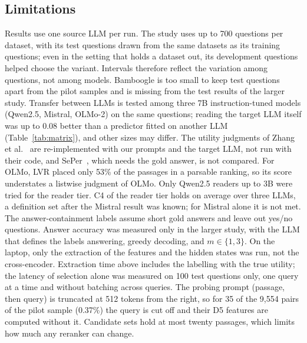 \documentclass[conference]{IEEEtran}
\begin{document}
\subsection{Limitations}
Results use one source LLM per run. The study uses up to 700 questions per dataset, with its test questions drawn from the same datasets as its training questions; even in the setting that holds a dataset out, its development questions helped choose the variant. Intervals therefore reflect the variation among questions, not among models. Bamboogle is too small to keep test questions apart from the pilot samples and is missing from the test results of the larger study. Transfer between LLMs is tested among three 7B instruction-tuned models (Qwen2.5, Mistral, OLMo-2) on the same questions; reading the target LLM itself was up to 0.08 better than a predictor fitted on another LLM (Table~\ref{tab:matrix}), and other sizes may differ. The utility judgments of Zhang et al.~\cite{zhang2025c} are re-implemented with our prompts and the target LLM, not run with their code, and SePer~\cite{dai2025}, which needs the gold answer, is not compared. For OLMo, LVR placed only 53\% of the passages in a parsable ranking, so its score understates a listwise judgment of OLMo. Only Qwen2.5 readers up to 3B were tried for the reader tier. C4 of the reader tier holds on average over three LLMs, a definition set after the Mistral result was known; for Mistral alone it is not met. The answer-containment labels assume short gold answers and leave out yes/no questions. Answer accuracy was measured only in the larger study, with the LLM that defines the labels answering, greedy decoding, and $m \in \{1, 3\}$. On the laptop, only the extraction of the features and the hidden states was run, not the cross-encoder. Extraction time above includes the labelling with the true utility; the latency of selection alone was measured on 100 test questions only, one query at a time and without batching across queries. The probing prompt (passage, then query) is truncated at 512 tokens from the right, so for 35 of the 9,554 pairs of the pilot sample (0.37\%) the query is cut off and their D5 features are computed without it. Candidate sets hold at most twenty passages, which limits how much any reranker can change.
\end{document}
